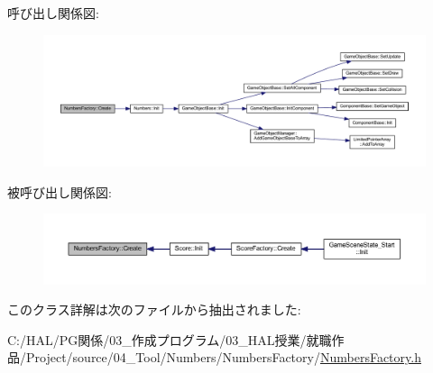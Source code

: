 呼び出し関係図\+:\nopagebreak
\begin{figure}[H]
\begin{center}
\leavevmode
\includegraphics[width=350pt]{class_numbers_factory_a2d2d0ae4f2d27c25cc73989b64d78c77_cgraph}
\end{center}
\end{figure}
被呼び出し関係図\+:\nopagebreak
\begin{figure}[H]
\begin{center}
\leavevmode
\includegraphics[width=350pt]{class_numbers_factory_a2d2d0ae4f2d27c25cc73989b64d78c77_icgraph}
\end{center}
\end{figure}


このクラス詳解は次のファイルから抽出されました\+:\begin{DoxyCompactItemize}
\item 
C\+:/\+H\+A\+L/\+P\+G関係/03\+\_\+作成プログラム/03\+\_\+\+H\+A\+L授業/就職作品/\+Project/source/04\+\_\+\+Tool/\+Numbers/\+Numbers\+Factory/\mbox{\hyperlink{_numbers_factory_8h}{Numbers\+Factory.\+h}}\end{DoxyCompactItemize}
